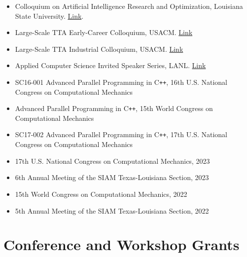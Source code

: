 \documentclass[11pt,a4paper,sans]{moderncv}
\begin{document}
\begin{itemize}[leftmargin=4cm]
\item Colloquium on Artificial Intelligence Research and Optimization, Louisiana State University. \href{https://stellar-group.org/research/distributed-machine-learning/}{Link}.
\item Large-Scale TTA Early-Career Colloquium, USACM. \href{https://www.usacm.org/site_page.cfm?pk_association_webpage_menu=11354&pk_association_webpage=25779}{Link}
\item Large-Scale TTA Industrial Colloquium, USACM. \href{https://www.usacm.org/site_page.cfm?pk_association_webpage_menu=11354&pk_association_webpage=25779}{Link}
\item Applied Computer Science Invited Speaker Series, LANL. \href{http://appliedcomputerscienceseries.lanl.gov/}{Link}
\end{itemize}

\begin{itemize}[leftmargin=4cm]
\item SC16-001 Advanced Parallel Programming in C\texttt{++}, 16th U.S. National Congress on Computational Mechanics
\item Advanced Parallel Programming in C\texttt{++}, 15th World Congress on Computational Mechanics
\item SC17-002 Advanced Parallel Programming in C\texttt{++}, 17th U.S. National Congress on Computational Mechanics
\end{itemize}

\begin{itemize}[leftmargin=4cm]
\item 17th U.S. National Congress on Computational Mechanics, 2023
\item 6th Annual Meeting of the SIAM Texas-Louisiana Section, 2023
\item 15th World Congress on Computational Mechanics, 2022
\item 5th Annual Meeting of the SIAM Texas-Louisiana Section, 2022
\end{itemize}

\section{Conference and Workshop Grants}
\end{document}
